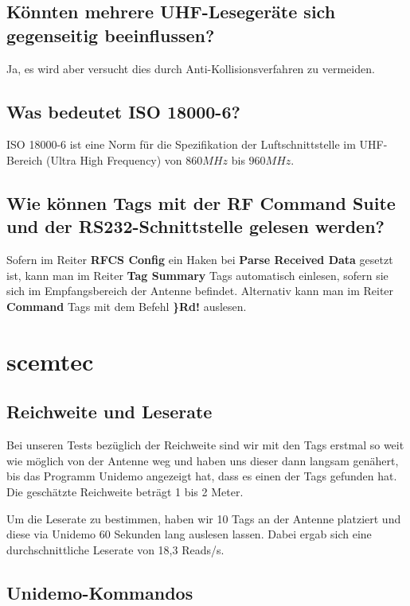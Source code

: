 \documentclass[paper=a4,fontsize=11pt,headsepline,footsepline,parskip=half]{scrartcl}
\begin{document}
\subsection{Könnten mehrere UHF-Lesegeräte sich gegenseitig beeinflussen?}

Ja, es wird aber versucht dies durch Anti-Kollisionsverfahren zu vermeiden.

\subsection{Was bedeutet ISO 18000-6?}

ISO 18000-6 ist eine Norm für die Spezifikation der Luftschnittstelle im UHF-Bereich (Ultra High Frequency) von $860 MHz$ bis $960 MHz$.

\subsection{Wie können Tags mit der RF Command Suite und der RS232-Schnittstelle gelesen werden?}

Sofern im Reiter \textbf{RFCS Config} ein Haken bei \textbf{Parse Received Data} gesetzt ist, kann man im Reiter \textbf{Tag Summary} Tags
automatisch einlesen, sofern sie sich im Empfangsbereich der Antenne befindet. Alternativ kann man im Reiter \textbf{Command} Tags mit dem Befehl
\textbf{\}Rd!} auslesen.

\section{scemtec}

\subsection{Reichweite und Leserate}

Bei unseren Tests bezüglich der Reichweite sind wir mit den Tags erstmal so weit wie möglich von der Antenne weg und haben uns dieser dann langsam
genähert, bis das Programm Unidemo angezeigt hat, dass es einen der Tags gefunden hat. Die geschätzte Reichweite beträgt 1 bis 2 Meter.

Um die Leserate zu bestimmen, haben wir 10 Tags an der Antenne platziert und diese via Unidemo 60 Sekunden lang auslesen lassen. Dabei ergab sich eine
durchschnittliche Leserate von 18,3 Reads/s.

\subsection{Unidemo-Kommandos}
\end{document}
